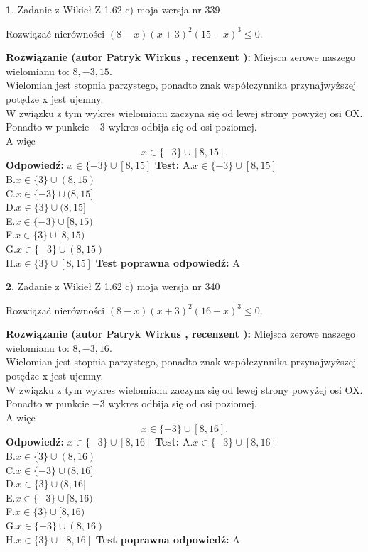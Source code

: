 \documentclass[12pt, a4paper]{article}
\theoremstyle{definition} %
\newtheorem{zad}{}
\newcommand{\zadStart}[1]{\begin{zad}#1\newline}
\newcommand{\zadStop}{\end{zad}}
\newcommand{\rozwStart}[2]{\noindent \textbf{Rozwiązanie (autor #1 , recenzent #2): }\newline}
\newcommand{\rozwStop}{\newline}
\newcommand{\odpStart}{\noindent \textbf{Odpowiedź:}\newline}
\newcommand{\odpStop}{\newline}
\newcommand{\testStart}{\noindent \textbf{Test:}\newline}
\newcommand{\testStop}{\newline}
\newcommand{\kluczStart}{\noindent \textbf{Test poprawna odpowiedź:}\newline}
\newcommand{\kluczStop}{\newline}
\begin{document}
\zadStart{Zadanie z Wikieł Z 1.62 c) moja wersja nr 339}

Rozwiązać nierówności $(8-x)(x+3)^{2}(15-x)^{3}\le0$.
\zadStop
\rozwStart{Patryk Wirkus}{}
Miejsca zerowe naszego wielomianu to: $8, -3, 15$.\\
Wielomian jest stopnia parzystego, ponadto znak współczynnika przy\linebreak najwyższej potędze x jest ujemny.\\ W związku z tym wykres wielomianu zaczyna się od lewej strony powyżej osi OX.\\
Ponadto w punkcie $-3$ wykres odbija się od osi poziomej.\\
A więc $$x \in \{-3\} \cup [8,15].$$
\rozwStop
\odpStart
$x \in \{-3\} \cup [8,15]$
\odpStop
\testStart
A.$x \in \{-3\} \cup [8,15]$\\
B.$x \in \{3\} \cup (8,15)$\\
C.$x \in \{-3\} \cup (8,15]$\\
D.$x \in \{3\} \cup (8,15]$\\
E.$x \in \{-3\} \cup [8,15)$\\
F.$x \in \{3\} \cup [8,15)$\\
G.$x \in \{-3\} \cup (8,15)$\\
H.$x \in \{3\} \cup [8,15]$
\testStop
\kluczStart
A
\kluczStop



\zadStart{Zadanie z Wikieł Z 1.62 c) moja wersja nr 340}

Rozwiązać nierówności $(8-x)(x+3)^{2}(16-x)^{3}\le0$.
\zadStop
\rozwStart{Patryk Wirkus}{}
Miejsca zerowe naszego wielomianu to: $8, -3, 16$.\\
Wielomian jest stopnia parzystego, ponadto znak współczynnika przy\linebreak najwyższej potędze x jest ujemny.\\ W związku z tym wykres wielomianu zaczyna się od lewej strony powyżej osi OX.\\
Ponadto w punkcie $-3$ wykres odbija się od osi poziomej.\\
A więc $$x \in \{-3\} \cup [8,16].$$
\rozwStop
\odpStart
$x \in \{-3\} \cup [8,16]$
\odpStop
\testStart
A.$x \in \{-3\} \cup [8,16]$\\
B.$x \in \{3\} \cup (8,16)$\\
C.$x \in \{-3\} \cup (8,16]$\\
D.$x \in \{3\} \cup (8,16]$\\
E.$x \in \{-3\} \cup [8,16)$\\
F.$x \in \{3\} \cup [8,16)$\\
G.$x \in \{-3\} \cup (8,16)$\\
H.$x \in \{3\} \cup [8,16]$
\testStop
\kluczStart
A
\kluczStop
\end{document}
